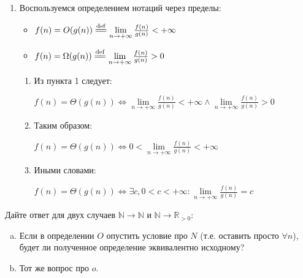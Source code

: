 \begin{solution}
\begin{enumerate}
\begin{enumerate}
                    \leavevmode\vspace{1pt}
                    
                    \qedsymbol
            \end{enumerate}

        \item Воспользуемся определением нотаций через пределы:

            \begin{itemize}
                \item $f(n) = O(g(n)) \defeq \lim\limits_{n \to +\infty} \frac{f(n)}{g(n)} < +\infty$
                \item $f(n) = \Omega(g(n)) \defeq \lim\limits_{n \to +\infty} \frac{f(n)}{g(n)} > 0$
            \end{itemize}

            \begin{enumerate}
                \item Из пункта 1 следует:

                    $f(n) = \Theta(g(n)) \Leftrightarrow \lim\limits_{n \to +\infty} \frac{f(n)}{g(n)} < +\infty \land \lim\limits_{n \to +\infty} \frac{f(n)}{g(n)} > 0$

                \item Таким образом:

                    $f(n) = \Theta(g(n)) \Leftrightarrow 0 < \lim\limits_{n \to +\infty} \frac{f(n)}{g(n)} < +\infty$

                \item Иными словами:

                    $f(n) = \Theta(g(n)) \Leftrightarrow \exists c,  0 < c < +\infty : \lim\limits_{n \to +\infty} \frac{f(n)}{g(n)} = c$
            \end{enumerate}
    \end{enumerate}
\end{solution}


\begin{problem}
    Дайте ответ для двух случаев $\mathbb{N} \to \mathbb{N}$ и $\mathbb{N} \to \mathbb{R}_{>0}$:
\end{problem}

\begin{enumerate}[(a)]
    \item Если в определении $O$ опустить условие про $N$ (т.е. оставить
        просто $\forall n$), будет ли полученное определение эквивалентно
        исходному?
    \item Тот же вопрос про $o$.
\end{enumerate}

